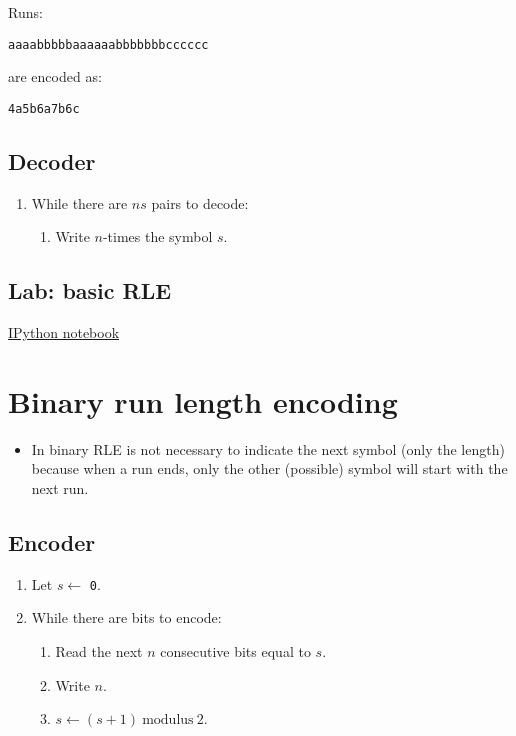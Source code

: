 Runs:

\begin{verbatim}
aaaabbbbbaaaaaabbbbbbbcccccc
\end{verbatim}

are encoded as:

\begin{verbatim}
4a5b6a7b6c
\end{verbatim}

\subsection{Decoder}

\begin{enumerate}
  \tightlist
\item While there are \(ns\) pairs to decode:
  \tightlist
  \begin{enumerate}
    \tightlist
  \item Write \(n\)-times the symbol \(s\).
  \end{enumerate}
\end{enumerate}

\subsection{Lab: basic RLE}
\href{https://nbviewer.jupyter.org/github/vicente-gonzalez-ruiz/Run-length_encoding/blob/master/RLE.ipynb}{IPython notebook}

\section{Binary run length encoding~\cite{sayood2017introduction}}

\begin{itemize}
  \tightlist
\item In binary RLE is not necessary to indicate the next symbol (only the
  length) because when a run ends, only the other (possible) symbol will
  start with the next run.
\end{itemize}

\subsection{Encoder}

\begin{enumerate}
\tightlist
\item
  Let \(s\leftarrow\) \texttt{0}.
\item
  While there are bits to encode:
  \tightlist
  \begin{enumerate}
  \tightlist
  \item
    Read the next \(n\) consecutive bits equal to \(s\).
  \item
    Write \(n\).
  \item
    \(s\leftarrow (s+1)~\text{modulus}~2\).
  \end{enumerate}
\end{enumerate}


